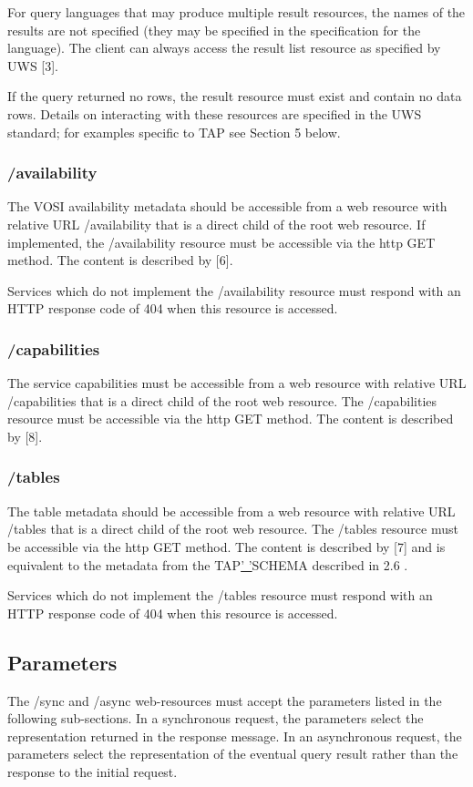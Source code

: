 \documentclass[11pt,a4paper]{ivoa}
\begin{document}
For query languages that may produce multiple result resources, the names of the 
results are not specified (they may be specified in the specification for the 
language). The client can always access the result list resource as specified by 
UWS [3].

If the query returned no rows, the result resource must exist and contain no 
data rows. Details on interacting with these resources are specified in the UWS 
standard; for examples specific to TAP see Section 5 below.

\subsubsection{/availability}
The VOSI availability metadata should be accessible from a web resource with 
relative URL /availability that is a direct child of the root web resource. If 
implemented, the /availability resource must be accessible via the http GET 
method. The content is described by [6].

Services which do not implement the /availability resource must respond with an 
HTTP response code of 404 when this resource is accessed.

\subsubsection{/capabilities}
The service capabilities must be accessible from a web resource with relative 
URL /capabilities that is a direct child of the root web resource. The 
/capabilities resource must be accessible via the http GET method. The content 
is described by [8].

\subsubsection{/tables}
The table metadata should be accessible from a web resource with relative URL 
/tables that is a direct child of the root web resource. The /tables resource 
must be accessible via the http GET method.  The content is described by [7] and 
is equivalent to the metadata from the TAP\underline{' '}SCHEMA described in 2.6 
.

Services which do not implement the /tables resource must respond with an HTTP 
response code of 404 when this resource is accessed.

\subsection{Parameters}
The /sync and /async web-resources must accept the parameters listed in the 
following sub-sections. In a synchronous request, the parameters select the 
representation returned in the response message. In an asynchronous request, the 
parameters select the representation of the eventual query result rather than 
the response to the initial request.
\end{document}
